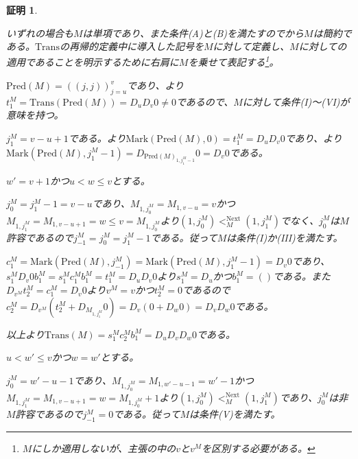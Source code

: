 \documentclass[dvipdfmx,uplatex]{jsarticle}
\theoremstyle{customnonumberbreakfortheorem}
\theoremstyle{customnonumberbreakforproof}
\newtheorem{hideableproof}{証明}
\begin{document}
\begin{hideableproof}
	\begin{indented}
		\item いずれの場合も\(M\)は単項であり、また条件(A)と(B)を満たすのでから\(M\)は簡約である。\(\textrm{Trans}\)の再帰的定義中に導入した記号を\(M\)に対して定義し、\(M\)に対しての適用であることを明示するために右肩に\(M\)を乗せて表記する\footnote{\(M\)にしか適用しないが、主張の中の\(v\)と\(v^M\)を区別する必要がある。}。
		\item \(\textrm{Pred}(M) = ((j,j))_{j=u}^{v}\)であり、より\(t_1^M = \textrm{Trans}(\textrm{Pred}(M)) = D_u D_v 0 \neq 0\)であるので、\(M\)に対して条件(I)～(VI)が意味を持つ。
		\item \(j_1^M = v-u+1\)である。より\(\textrm{Mark}(\textrm{Pred}(M),0) = t_1^M = D_u D_v 0\)であり、より\(\textrm{Mark}(\textrm{Pred}(M),j_1^M-1) = D_{\textrm{Pred}(M)_{1,j_1^M-1}} 0 = D_v 0\)である。
		\item \(w' = v+1\)かつ\(u < w \leq v\)とする。
		\begin{indented}
			\item \(j_0^M = j_1^M-1 = v-u\)であり、\(M_{1,j_0^M} = M_{1,v-u} = v\)かつ\(M_{1,j_1^M} = M_{1,v-u+1} = w \leq v = M_{1,j_0^M}\)より\((1,j_0^M) <_M^{\textrm{Next}} (1,j_1^M)\)でなく、\(j_0^M\)は\(M\)許容であるので\(j_{-1}^M = j_0^M = j_1^M-1\)である。従って\(M\)は条件(I)か(III)を満たす。
			\item \(c_1^M = \textrm{Mark}(\textrm{Pred}(M),j_{-1}^M) = \textrm{Mark}(\textrm{Pred}(M),j_1^M-1) = D_v 0\)であり、\(s_1^M D_v 0 b_1^M = s_1^M c_1^M b_1^M = t_1^M = D_u D_v 0\)より\(s_1^M = D_u\)かつ\(b_1^M = ()\)である。また\(D_{v^M} t_2^M = c_1^M = D_v 0\)より\(v^M = v\)かつ\(t_2^M = 0\)であるので\(c_2^M = D_{v^M}(t_2^M + D_{M_{1,j_1^M}} 0) = D_v(0 + D_w 0) = D_v D_w 0\)である。
			\item 以上より\(\textrm{Trans}(M) = s_1^M c_2^M b_1^M = D_u D_v D_w 0\)である。
		\end{indented}
		\item \(u < w' \leq v\)かつ\(w = w'\)とする。
		\begin{indented}
			\item \(j_0^M = w'-u-1\)であり、\(M_{1,j_0^M} = M_{1,w'-u-1} = w'-1\)かつ\(M_{1,j_1^M} = M_{1,v-u+1} = w = M_{1,j_0^M}+1\)より\((1,j_0^M) <_M^{\textrm{Next}} (1,j_1^M)\)であり、\(j_0^M\)は非\(M\)許容であるので\(j_{-1}^M = 0\)である。従って\(M\)は条件(V)を満たす。

\end{indented}
\end{indented}
\end{hideableproof}
\end{document}
